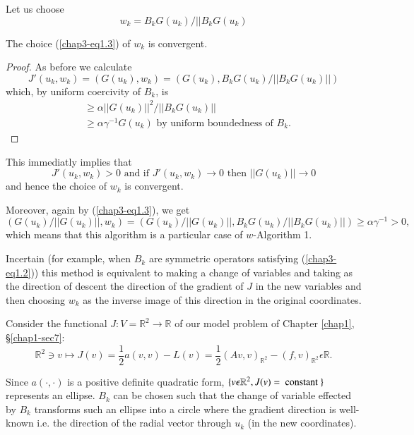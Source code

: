 Let us choose
\begin{equation*}
w_{k} = B_{k} G(u_{k})/||B_{k} G(u_{k})\tag{1.3}\label{chap3-eq1.3}
\end{equation*}

\begin{proposition}\label{chap3-prop1.2}
The choice (\ref{chap3-eq1.3}) of $w_{k}$ is convergent. 
\end{proposition}

\begin{proof}
As before we calculate
$$
J'(u_{k}, w_{k}) = (G(u_{k}), w_{k}) = (G(u_{k}), B_{k}G(u_{k})/||B_{k} G(u_{k})||)
$$
which, by uniform coercivity of $B_{k}$, is
\begin{align*}
& \geq \alpha||G(u_{k})||^{2} / ||B_{k}G(u_{k})||\\
& \geq \alpha \gamma^{-1} G(u_{k}) \text{ by uniform boundedness of } B_{k}.
\end{align*}
\end{proof}

This immediatly implies that
$$
J'(u_{k}, w_{k}) > 0 \text{ and if } J'(u_{k}, w_{k}) \to 0 \text{ then } ||G(u_{k})|| \to 0
$$
and hence the choice of $w_{k}$ is convergent.

Moreover, again by (\ref{chap3-eq1.3}), we get
{\fontsize{10}{12}\selectfont
$$
(G(u_{k}) / ||G(u_{k})||, w_{k}) = (G(u_{k})/ ||G(u_{k})||, B_{k} G(u_{k})/ ||B_{k} G(u_{k})||) \geq \alpha \gamma^{-1} > 0,
$$}
which means that this algorithm is a particular case of $w$-Algorithm 1.

\begin{remark}\label{chap3-rem1.1}
In\pageoriginale certain (for example, when $B_{k}$ are symmetric operators satisfying (\ref{chap3-eq1.2})) this method is equivalent to making a change of variables and taking as the direction of descent the direction of the gradient of $J$  in the new variables and then choosing $w_{k}$ as the inverse image of this direction in the original coordinates.

Consider the functional $J : V = \mathbb{R}^{2} \to \mathbb{R}$ of our model problem of Chapter \ref{chap1}, \S \ref{chap1-sec7}:
$$
\mathbb{R}^{2} \ni v \mapsto J(v) = \frac{1}{2} a(v, v) - L(v) = \frac{1}{2} (Av, v)_{\mathbb{R}^{2}} - (f, v)_{\mathbb{R}^{2}} \epsilon \mathbb{R}.
$$
\end{remark}

Since $a(\cdot , \cdot)$ is a positive definite quadratic form, $\{v
\epsilon \mathbb{R}^{2}, J(v) =\break \text{ constant } \}$ represents an ellipse. $B_{k}$ can be chosen such that the change of variable effected by $B_{k}$ transforms such an ellipse into a circle where the gradient direction is well-known i.e. the direction of the radial vector through $u_{k}$ (in the new coordinates).

